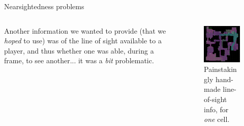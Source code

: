 \documentclass[english]{beamer}
\begin{document}
\begin{frame}{Nearsightedness problems}
  \begin{columns}
    \begin{column}{0.55\textwidth}
      Another information we wanted to provide (that we \emph{hoped} to use) was of the line of sight available to a player, and thus whether one was able, during a frame, to see another... it was a \emph{bit} problematic.
    \end{column}
    \begin{column}{0.45\textwidth}
      \begin{figure}
        \centering
        \includegraphics[width=1\textwidth]{images/view_car.png}
        \caption{Painstakingly hand-made line-of-sight info, for \emph{one} cell.}
        \end{figure}
    \end{column}
  \end{columns}
\end{frame}
\end{document}
